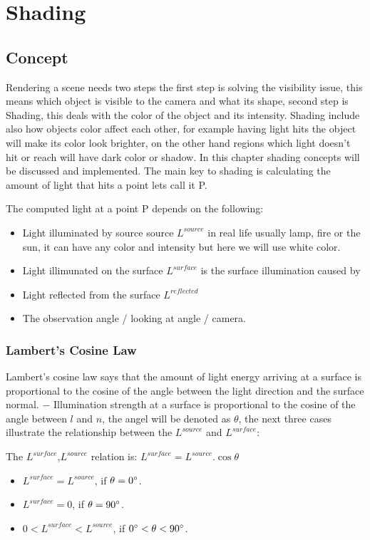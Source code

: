 \documentclass{article}
\begin{document}
\clearpage


\section{Shading}
\subsection{Concept}

Rendering a scene needs two steps the first step is solving the visibility issue, this means which object is visible to the camera and what its shape, second step is Shading, this deals with the color of the object and its intensity. Shading include also how objects color affect each other, for example having light hits the object will make its color look brighter, on the other hand regions which light doesn't hit or reach will have dark color or shadow. In this chapter shading concepts will be discussed and implemented.  The main key to shading is calculating the amount of light that hits a point lets call it P. 

The computed light at a point P depends on the following: 

\begin{itemize}
	\item Light illuminated by source source  $L^{source}$  in real life usually lamp, fire or the sun, it can have any color and intensity but here we will use white color. 
	\item Light illimunated on the surface $L^{surface}$ is the surface illumination caused by
	\item Light reflected from the surface $L^{reflected}$
	\item The observation angle / looking at angle / camera. 
\end{itemize}




\subsubsection{Lambert’s Cosine Law}
Lambert's cosine law says that the amount of light energy arriving at a surface is proportional to the cosine of the angle between the light direction and the surface normal. − Illumination strength at a surface is proportional to the cosine of the angle between $l$ and $n$, the angel will be denoted as $\theta$, the next three cases illustrate the relationship between the  $L^{source}$ and  $L^{surface}$:

The  $L^{surface}$,$ L^{source}$ relation is: $L^{surface} = L^{source}.\cos \theta $
\begin{itemize}
	\item $L^{surface} = L^{source}$, if $\theta = 0\degree$.
	\item $L^{surface} = 0$, if $\theta = 90\degree$.
    \item $0 < L^{surface} < L^{source}$, if $0\degree < \theta  < 90\degree$.
\end{itemize}
\end{document}
